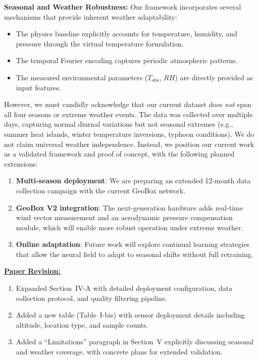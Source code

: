 \textbf{Seasonal and Weather Robustness:}
Our framework incorporates several mechanisms that provide inherent weather adaptability:
\begin{itemize}
    \item The physics baseline explicitly accounts for temperature, humidity, and pressure through the virtual temperature formulation.
    \item The temporal Fourier encoding captures periodic atmospheric patterns.
    \item The measured environmental parameters ($T_{\text{obs}}$, $RH$) are directly provided as input features.
\end{itemize}

However, we must candidly acknowledge that our current dataset does \emph{not} span all four seasons or extreme weather events. The data was collected over multiple days, capturing normal diurnal variations but not seasonal extremes (e.g., summer heat islands, winter temperature inversions, typhoon conditions). We do not claim universal weather independence. Instead, we position our current work as a validated framework and proof of concept, with the following planned extensions:
\begin{enumerate}
    \item \textbf{Multi-season deployment}: We are preparing an extended 12-month data collection campaign with the current GeoBox network.
    \item \textbf{GeoBox V2 integration}: The next-generation hardware adds real-time wind vector measurement and an aerodynamic pressure compensation module, which will enable more robust operation under extreme weather.
    \item \textbf{Online adaptation}: Future work will explore continual learning strategies that allow the neural field to adapt to seasonal shifts without full retraining.
\end{enumerate}

\vspace{0.1cm}
\noindent
\underline{\textbf{Paper Revision:}}

\begin{enumerate}
    \item Expanded Section~IV-A with detailed deployment configuration, data collection protocol, and quality filtering pipeline.
    \item Added a new table (Table~I-bis) with sensor deployment details including altitude, location type, and sample counts.
    \item Added a ``Limitations'' paragraph in Section~V explicitly discussing seasonal and weather coverage, with concrete plans for extended validation.
\end{enumerate}

